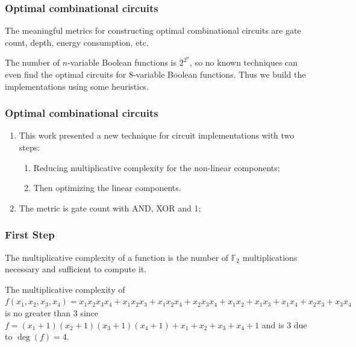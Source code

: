 \documentclass[
    aspectratio=169,                   %
]{beamer}
\newcommand{\F}{\mathbb{F}}
\begin{document}
    \begin{frame}
        \frametitle{Optimal combinational circuits}
        
       The meaningful metrics for constructing optimal combinational circuits are gate count, depth, energy consumption, etc.

       The number of $ n $-variable Boolean functions is $ 2^{2^n} $, so no known techniques can even find the optimal circuits for $ 8 $-variable Boolean functions. 
       Thus we build the implementations using some heuristics. 

    \end{frame}
    \begin{frame}
        \frametitle{Optimal combinational circuits}
        
        \begin{enumerate}
            \item This work presented a new technique for circuit implementations with two steps:
            \begin{enumerate}
                \item Reducing multiplicative complexity for the non-linear components;
                \item Then optimizing the linear components.
            \end{enumerate}
            \item The metric is gate count with AND, XOR and 1;
        \end{enumerate}
        
    \end{frame}

    \begin{frame}
        \frametitle{First Step}
    
        \begin{definition}
            The multiplicative complexity of a function is the number of $ \F_2 $ multiplications necessary and sufficient to compute it.
        \end{definition}

        \begin{example}
            The multiplicative complexity of 
            $ f(x_1,x_2,x_3,x_4)=x_{1} x_{2} x_{3} x_{4}+x_{1} x_{2} x_{3}+x_{1} x_{2} x_{4}+x_{2} x_{3} x_{4}+x_{1} x_{2}+x_{1} x_{3}+x_{1} x_{4}+x_{2} x_{3}+x_{3} x_{4} $ 
            is no greater than $ 3 $ since $ f=(x_1+1)(x_2+1)(x_3+1)(x_4+1)+x_1+x_2+x_3+x_4+1 $
            and is $ 3 $ due to $ \operatorname{deg}(f)=4 $.
        \end{example}
    
    \end{frame}
\end{document}
